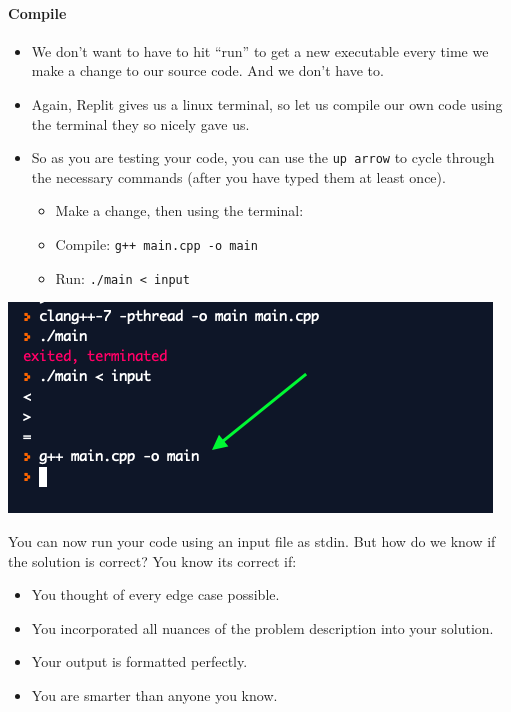 \hypertarget{compile}{%
\paragraph{Compile}\label{compile}}

\begin{itemize}
\tightlist
\item
  We don't want to have to hit ``run'' to get a new executable every
  time we make a change to our source code. And we don't have to.
\item
  Again, Replit gives us a linux terminal, so let us compile our own
  code using the terminal they so nicely gave us.
\item
  So as you are testing your code, you can use the \texttt{up\ arrow} to
  cycle through the necessary commands (after you have typed them at
  least once).

  \begin{itemize}
  \tightlist
  \item
    Make a change, then using the terminal:
  \item
    Compile: \texttt{g++\ main.cpp\ -o\ main}
  \item
    Run: \texttt{./main\ \textless{}\ input}
  \end{itemize}
\end{itemize}

\begin{center}
\includegraphics[scale=.4]{images/replit_stdin_5.png}
\end{center}

\hypertarget{testing-your-solution}{%
\label{testing-your-solution}}

You can now run your code using an input file as stdin. But how do we
know if the solution is correct? You know its correct if:

\begin{itemize}
\tightlist
\item
  You thought of every edge case possible.
\item
  You incorporated all nuances of the problem description into your
  solution.
\item
  Your output is formatted perfectly.
\item
  You are smarter than anyone you know.
\end{itemize}

